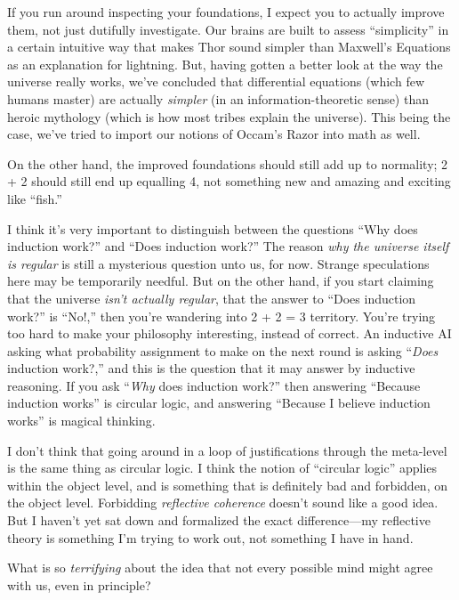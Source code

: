 {
 If you run around inspecting your foundations, I expect you to
actually improve them, not just dutifully investigate. Our brains are
built to assess ``simplicity'' in a
certain intuitive way that makes Thor sound simpler than
Maxwell's Equations as an explanation for lightning.
But, having gotten a better look at the way the universe really works,
we've concluded that differential equations (which few
humans master) are actually \textit{simpler} (in an
information-theoretic sense) than heroic mythology (which is how most
tribes explain the universe). This being the case,
we've tried to import our notions of
Occam's Razor into math as well.}

{
 On the other hand, the improved foundations should still add up to
normality; 2 + 2 should still end up equalling 4, not something new and
amazing and exciting like ``fish.''}

{
 I think it's very important to distinguish between
the questions ``Why does induction
work?'' and ``Does induction
work?'' The reason \textit{why the universe itself is
regular} is still a mysterious question unto us, for now. Strange
speculations here may be temporarily needful. But on the other hand, if
you start claiming that the universe \textit{isn't
actually regular}, that the answer to ``Does induction
work?'' is
``No!,'' then you're
wandering into 2 + 2 = 3 territory. You're trying too
hard to make your philosophy interesting, instead of correct. An
inductive AI asking what probability assignment to make on the next
round is asking ``\textit{Does} induction
work?,'' and this is the question that it may answer
by inductive reasoning. If you ask ``\textit{Why} does
induction work?'' then answering
``Because induction works'' is
circular logic, and answering ``Because I believe
induction works'' is magical thinking.}

{
 I don't think that going around in a loop of
justifications through the meta-level is the same thing as circular
logic. I think the notion of ``circular
logic'' applies within the object level, and is
something that is definitely bad and forbidden, on the object level.
Forbidding \textit{reflective coherence} doesn't sound
like a good idea. But I haven't yet sat down and
formalized the exact difference---my reflective theory is something
I'm trying to work out, not something I have in hand.}

\myendsectiontext


{
 What is so \textit{terrifying} about the idea that not every
possible mind might agree with us, even in principle? }

